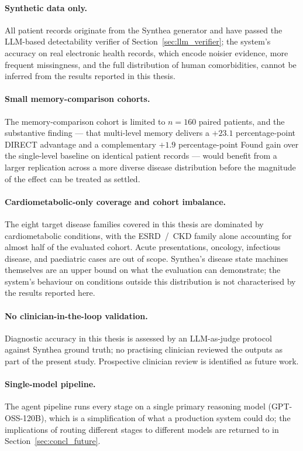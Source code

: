 \paragraph{Synthetic data only.}
All patient records originate from the Synthea generator and have passed
the LLM-based detectability verifier of
Section~\ref{sec:llm_verifier}; the system's accuracy on real electronic
health records, which encode noisier evidence, more frequent missingness,
and the full distribution of human comorbidities, cannot be inferred
from the results reported in this thesis.

\paragraph{Small memory-comparison cohorts.}
The memory-comparison cohort is limited to $n = 160$ paired patients,
and the substantive finding --- that multi-level memory delivers a
$+23.1$ percentage-point DIRECT advantage and a complementary
$+1.9$ percentage-point Found gain over the single-level baseline on
identical patient records --- would benefit from a larger replication
across a more diverse disease distribution before the magnitude of the
effect can be treated as settled.

\paragraph{Cardiometabolic-only coverage and cohort imbalance.}
The eight target disease families covered in this thesis are dominated
by cardiometabolic conditions, with the ESRD~/~CKD family alone
accounting for almost half of the evaluated cohort. Acute presentations,
oncology, infectious disease, and paediatric cases are out of scope.
Synthea's disease state machines themselves are an upper bound on what
the evaluation can demonstrate; the system's behaviour on conditions
outside this distribution is not characterised by the results reported
here.

\paragraph{No clinician-in-the-loop validation.}
Diagnostic accuracy in this thesis is assessed by an LLM-as-judge
protocol against Synthea ground truth; no practising clinician
reviewed the outputs as part of the present study. Prospective
clinician review is identified as future work.

\paragraph{Single-model pipeline.}
The agent pipeline runs every stage on a single primary reasoning model
(GPT-OSS-120B), which is a simplification of what a production system
could do; the implications of routing different stages to different
models are returned to in Section~\ref{sec:concl_future}.

